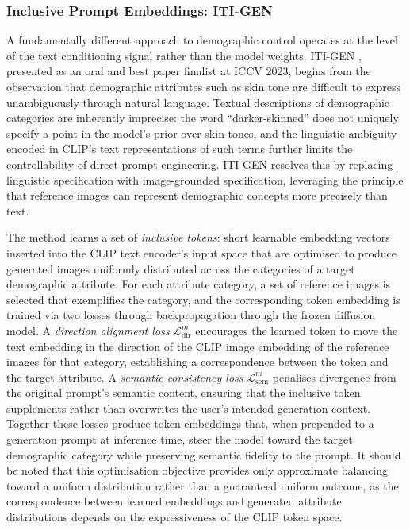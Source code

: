 \subsubsection*{Inclusive Prompt Embeddings: ITI-GEN}

A fundamentally different approach to demographic control operates 
at the level of the text conditioning signal rather than the model 
weights. ITI-GEN \cite{Zhang_2023_ITIGEN}, presented as an oral 
and best paper finalist at ICCV 2023, begins from the observation 
that demographic attributes such as skin tone are difficult to 
express unambiguously through natural language. Textual descriptions 
of demographic categories are inherently imprecise: the word 
``darker-skinned'' does not uniquely specify a point in the model's 
prior over skin tones, and the linguistic ambiguity encoded in 
CLIP's text representations of such terms further limits the 
controllability of direct prompt engineering. ITI-GEN resolves this 
by replacing linguistic specification with image-grounded 
specification, leveraging the principle that reference images can 
represent demographic concepts more precisely than text.

The method learns a set of \textit{inclusive tokens}: short 
learnable embedding vectors inserted into the CLIP text encoder's 
input space that are optimised to produce generated images uniformly 
distributed across the categories of a target demographic attribute. 
For each attribute category, a set of reference images is selected 
that exemplifies the category, and the corresponding token embedding 
is trained via two losses through backpropagation through the frozen 
diffusion model. A \textit{direction alignment loss} 
$\mathcal{L}^m_\text{dir}$ encourages the learned token to move 
the text embedding in the direction of the CLIP image embedding of 
the reference images for that category, establishing a correspondence 
between the token and the target attribute. A \textit{semantic 
	consistency loss} $\mathcal{L}^m_\text{sem}$ penalises divergence 
from the original prompt's semantic content, ensuring that the 
inclusive token supplements rather than overwrites the user's 
intended generation context. Together these losses produce token 
embeddings that, when prepended to a generation prompt at inference 
time, steer the model toward the target demographic category while 
preserving semantic fidelity to the prompt. It should be noted that 
this optimisation objective provides only approximate balancing 
toward a uniform distribution rather than a guaranteed uniform 
outcome, as the correspondence between learned embeddings and 
generated attribute distributions depends on the expressiveness 
of the CLIP token space.


